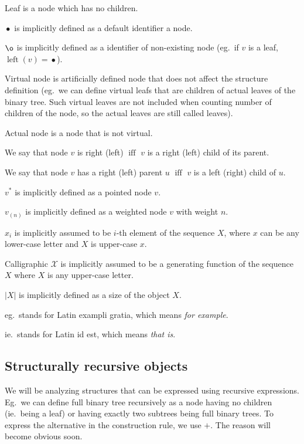 \documentclass[final]{article}
\theoremstyle{definition}
\theoremstyle{remark}
\newcommand{\gf}[1]{\ensuremath{\mathcal{#1}}}
\newcommand{\pointed}[1]{\ensuremath{{#1}^*}}
\newcommand{\weighted}[1]{\ensuremath{_{(#1)}}}
\newcommand{\size}[1]{\ensuremath{\left|#1\right|}}
\DeclareMathOperator{\textiff}{\text{iff}}
\DeclareMathOperator{\tleft}{\text{left}}
\DeclareMathOperator{\n}{\bullet}
\DeclareMathOperator{\no}{\o}
\begin{document}
Leaf is a node which has no children.

\(\n\) is implicitly defined as a default identifier a node.

\(\no\) is implicitly defined as a identifier of non-existing node (eg.\ if \(v\) is a leaf, \(\tleft(v) = \n\)).

Virtual node is artificially defined node that does not affect the structure definition (eg.\ we can define virtual leafs that are children of actual leaves of the binary tree. Such virtual leaves are not included when counting number of children of the node, so the actual leaves are still called leaves).

Actual node is a node that is not virtual.

We say that node \(v\) is right (left) \(\textiff\) \(v\) is a right (left) child of its parent.

We say that node \(v\) has a right (left) parent \(u\) \(\textiff\) \(v\) is a left (right) child of \(u\).

\(\pointed{v}\) is implicitly defined as a pointed node \(v\).

\(v\weighted{n}\) is implicitly defined as a weighted node \(v\) with weight \(n\).

\(x_i\) is implicitly assumed to be \(i\)-th element of the sequence \(X\), where \(x\) can be any lower-case letter and \(X\) is upper-case \(x\).

Calligraphic \(\gf{X}\) is implicitly assumed to be a generating function of the sequence \(X\) where \(X\) is any upper-case letter.

\(\size{X}\) is implicitly defined as a size of the object \(X\).

eg.\ stands for Latin exampli gratia, which means \textit{for example}.

ie.\ stands for Latin id est, which means \textit{that is}.

\subsection{Structurally recursive objects}%
\label{sub:structurally_recursive_objects}

We will be analyzing structures that can be expressed using recursive expressions. Eg.\ we can define full binary tree recursively as a node having no children (ie.\ being a leaf) or having exactly two subtrees being full binary trees. To express the alternative in the construction rule, we use \(+\). The reason will become obvious soon.
\end{document}
